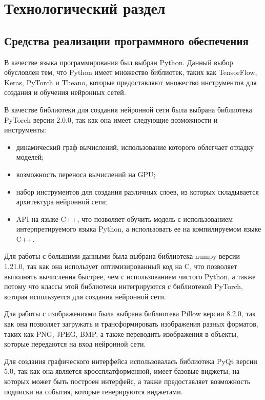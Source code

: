 \chapter{Технологический раздел}

\section{Средства реализации программного обеспечения}

В качестве языка программирования был выбран Python. Данный выбор обусловлен тем, что Python имеет множество библиотек, таких как TensorFlow, Keras, PyTorch и Theano, которые предоставляют множество инструментов для создания и обучения нейронных сетей.

В качестве библиотеки для создания нейронной сети была выбрана библиотека PyTorch версии 2.0.0, так как она имеет следующие возможности и инструменты:
\begin{itemize}
	\item динамический граф вычислений, использование которого облегчает отладку моделей;
	\item возможность переноса вычислений на GPU;
	\item набор инструментов для создания различных слоев, из которых складывается архитектура нейронной сети;
	\item API на языке C++, что позволяет обучить модель с использованием интерпретируемого языка Python, а использовать ее на компилируемом языке C++.
\end{itemize}

Для работы с большими данными была выбрана библиотека numpy версии 1.21.0, так как она использует оптимизированный код на C, что позволяет выполнять вычисления быстрее, чем с использованием чистого Python, а также потому что классы этой библиотеки интегрируются с библиотекой PyTorch, которая используется для создания нейронной сети.

Для работы с изображениями была выбрана библиотека Pillow версии 8.2.0, так как она позволяет загружать и трансформировать изображения разных форматов, таких как PNG, JPEG, BMP, а также переводить изображения в объекты, которые передаются на вход нейронной сети.

Для создания графического интерфейса использовалась библиотека PyQt версии 5.0, так как она является кроссплатформенной, имеет базовые виджеты, на которых может быть построен интерфейс, а также предоставляет возможность подписки на события, которые генерируются виджетами.

